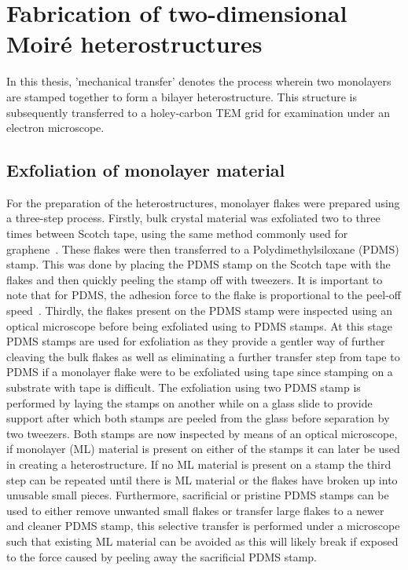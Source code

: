 \section{Fabrication of two-dimensional Moiré heterostructures}
%
In this thesis, 'mechanical transfer' denotes the process wherein two monolayers are stamped together to form a bilayer heterostructure. This structure is subsequently transferred to a holey-carbon TEM grid for examination under an electron microscope.

\subsection{Exfoliation of monolayer material}
%
For the preparation of the heterostructures, monolayer flakes were prepared using a three-step process.
%
Firstly, bulk crystal material was exfoliated two to three times between Scotch tape, using the same method commonly used for graphene~\cite{novoselovRoomTemperatureQuantumHall2007}. 
%
These flakes were then transferred to a Polydimethylsiloxane (PDMS) stamp.
%
This was done by placing the PDMS stamp on the Scotch tape with the flakes and then quickly peeling the stamp off with tweezers. 
%
It is important to note that for PDMS, the adhesion force to the flake is proportional to the peel-off speed~\cite{kusakaMicrocontactPatterningConductive2015}.
%
Thirdly, the flakes present on the PDMS stamp were inspected using an optical microscope before being exfoliated using to PDMS stamps. At this stage PDMS stamps are used for exfoliation as they provide a gentler way of further cleaving the bulk flakes as well as eliminating a further transfer step from tape to PDMS if a monolayer flake were to be exfoliated using tape since stamping on a substrate with tape is difficult. The exfoliation using two PDMS stamp is performed by laying the stamps on another while on a glass slide to provide support after which both stamps are peeled from the glass before separation by two tweezers. Both stamps are now inspected by means of an optical microscope, if monolayer (ML) material is present on either of the stamps it can later be used in creating a heterostructure.
If no ML material is present on a stamp the third step can be repeated until there is ML material or the flakes have broken up into unusable small pieces.
Furthermore, sacrificial or pristine PDMS stamps can be used to either remove unwanted small flakes or transfer large flakes to a newer and cleaner PDMS stamp, this selective transfer is performed under a microscope such that existing ML material can be avoided as this will likely break if exposed to the force caused by peeling away the sacrificial PDMS stamp.

